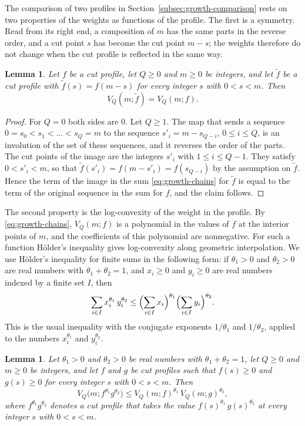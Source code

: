 \documentclass{amsart}
\newtheorem{lemma}[theorem]{Lemma}
\theoremstyle{definition}
\theoremstyle{remark}
\numberwithin{equation}{section}
\begin{document}
The comparison of two profiles in Section~\ref{subsec:growth-comparison}
rests on two properties of the weights as functions of the profile. The
first is a symmetry. Read from its right end, a
composition of $m$ has the same parts in the reverse order, and a cut point
$s$ has become the cut point $m-s$; the weights therefore do not change when
the cut profile is reflected in the same way.

\begin{lemma}\label{lem:reflection}
Let $f$ be a cut profile, let $Q\ge0$ and $m\ge0$ be integers, and let
$\tilde f$ be a cut profile with $\tilde f(s)=f(m-s)$ for every integer $s$
with $0<s<m$. Then
\[
V_Q(m;\tilde f)=V_Q(m;f).
\]
\end{lemma}

\begin{proof}
For $Q=0$ both sides are $0$. Let $Q\ge1$. The map that sends a sequence
$0=s_0<s_1<\dots<s_Q=m$ to the sequence $s'_i=m-s_{Q-i}$, $0\le i\le Q$, is
an involution of the set of these sequences, and it reverses the order of
the parts. The cut points of the image are the integers $s'_i$ with
$1\le i\le Q-1$. They satisfy $0<s'_i<m$, so that
$\tilde f(s'_i)=f(m-s'_i)=f(s_{Q-i})$ by the assumption on $\tilde f$.
Hence the term of the image in the sum \eqref{eq:growth-chains} for
$\tilde f$ is equal to the term of the original sequence in the sum for
$f$, and the claim follows.
\end{proof}

The second property is the log-convexity of the weight in the profile. By
\eqref{eq:growth-chains}, $V_Q(m;f)$ is a polynomial in the values of $f$ at
the interior points of $m$, and the coefficients of this polynomial are
nonnegative. For such a function H\"older's inequality gives log-convexity
along geometric interpolation. We use H\"older's inequality for finite sums
in the following form: if $\theta_1>0$ and $\theta_2>0$ are real numbers
with $\theta_1+\theta_2=1$, and $x_i\ge0$ and $y_i\ge0$ are real numbers
indexed by a finite set $I$, then
\begin{equation}\label{eq:growth-hoelder}
\sum_{i\in I}x_i^{\theta_1}\,y_i^{\theta_2}
\le\Bigl(\sum_{i\in I}x_i\Bigr)^{\theta_1}
\Bigl(\sum_{i\in I}y_i\Bigr)^{\theta_2}.
\end{equation}
This is the usual inequality with the conjugate exponents $1/\theta_1$ and
$1/\theta_2$, applied to the numbers $x_i^{\theta_1}$ and $y_i^{\theta_2}$.

\begin{lemma}\label{lem:profileconvex}
Let $\theta_1>0$ and $\theta_2>0$ be real numbers with
$\theta_1+\theta_2=1$, let $Q\ge0$ and $m\ge0$ be integers, and let $f$ and
$g$ be cut profiles such that $f(s)\ge0$ and $g(s)\ge0$ for every integer
$s$ with $0<s<m$. Then
\[
V_Q\bigl(m;f^{\theta_1}g^{\theta_2}\bigr)
\le V_Q(m;f)^{\theta_1}\,V_Q(m;g)^{\theta_2},
\]
where $f^{\theta_1}g^{\theta_2}$ denotes a cut profile that takes the value
$f(s)^{\theta_1}\,g(s)^{\theta_2}$ at every integer $s$ with $0<s<m$.
\end{lemma}
\end{document}
